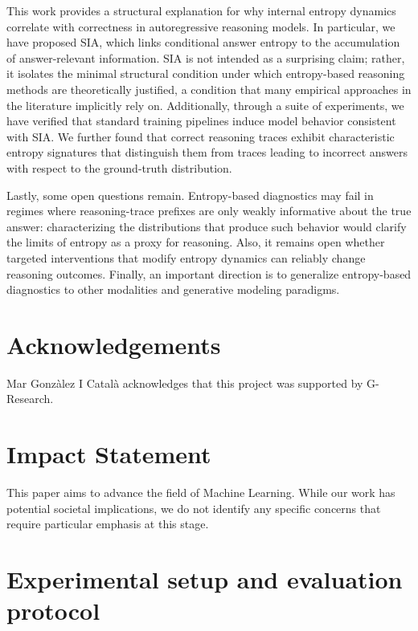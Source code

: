 \documentclass{article}
\begin{document}
This work provides a structural explanation for why internal entropy dynamics correlate with correctness in autoregressive reasoning models. In particular, we have proposed SIA, which links conditional answer entropy to the accumulation of answer-relevant information. SIA is not intended as a surprising claim; rather, it isolates the minimal structural condition under which entropy-based reasoning methods are theoretically justified, a condition that many empirical approaches in the literature implicitly rely on. Additionally, through a suite of experiments, we have verified that standard training pipelines induce model behavior consistent with SIA. We further found that correct reasoning traces exhibit characteristic entropy signatures that distinguish them from traces leading to incorrect answers with respect to the ground-truth distribution.

Lastly, some open questions remain. Entropy-based diagnostics may fail in regimes where reasoning-trace prefixes are only weakly informative about the true answer: characterizing the distributions that produce such behavior would clarify the limits of entropy as a proxy for reasoning. Also, it remains open whether targeted interventions that modify entropy dynamics can reliably change reasoning outcomes. Finally, an important direction is to generalize entropy-based diagnostics to other modalities and generative modeling paradigms.

\section*{Acknowledgements}
Mar Gonzàlez I Català acknowledges that this project was supported by G-Research.

\section*{Impact Statement}
This paper aims to advance the field of Machine Learning. While our work has potential societal implications, we do not identify any specific concerns that require particular emphasis at this stage.





\appendix
\onecolumn
\section{Experimental setup and evaluation protocol}
\label{app:exp}
\end{document}
